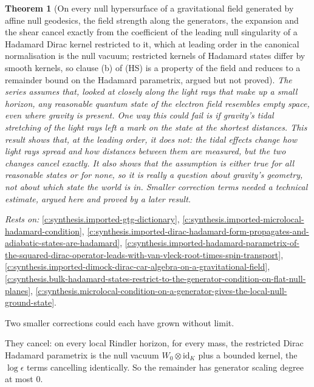 \documentclass[11pt]{article}
\newtheorem{theorem}{Theorem}[section]
\theoremstyle{definition}
\theoremstyle{plain}
\providecommand{\id}{}\renewcommand{\id}{\mathrm{id}}
\begin{document}
\begin{theorem}[On every null hypersurface of a gravitational field generated by affine null geodesics, the field strength along the generators, the expansion and the shear cancel exactly from the coefficient of the leading null singularity of a Hadamard Dirac kernel restricted to it, which at leading order in the canonical normalisation is the null vacuum; restricted kernels of Hadamard states differ by smooth kernels, so clause (b) of (HS) is a property of the field and reduces to a remainder bound on the Hadamard parametrix, argued but not proved]\label{c:synthesis.field-strength-cancels-from-the-leading-null-singularity-of-hadamard-dirac-states-on-null-hypersurfaces}
The series assumes that, looked at closely along the light rays that make up a small horizon, any reasonable quantum state of the electron field resembles empty space, even where gravity is present. One way this could fail is if gravity's tidal stretching of the light rays left a mark on the state at the shortest distances. This result shows that, at the leading order, it does not: the tidal effects change how light rays spread and how distances between them are measured, but the two changes cancel exactly. It also shows that the assumption is either true for all reasonable states or for none, so it is really a question about gravity's geometry, not about which state the world is in. Smaller correction terms needed a technical estimate, argued here and proved by a later result.
\end{theorem}
\noindent\emph{Rests on:} \ref{c:synthesis.imported-gtg-dictionary}, \ref{c:synthesis.imported-microlocal-hadamard-condition}, \ref{c:synthesis.imported-dirac-hadamard-form-propagates-and-adiabatic-states-are-hadamard}, \ref{c:synthesis.imported-hadamard-parametrix-of-the-squared-dirac-operator-leads-with-van-vleck-root-times-spin-transport}, \ref{c:synthesis.imported-dimock-dirac-car-algebra-on-a-gravitational-field}, \ref{c:synthesis.bulk-hadamard-states-restrict-to-the-generator-condition-on-flat-null-planes}, \ref{c:synthesis.microlocal-condition-on-a-generator-gives-the-local-null-ground-state}.

Two smaller corrections could each have grown without limit.

They cancel: on every local Rindler horizon, for every mass, the restricted Dirac Hadamard parametrix is the null vacuum $W_{0}\otimes\id_{K}$ plus a bounded kernel, the $\log\epsilon$ terms cancelling identically. So the remainder has generator scaling degree at most $0$.
\end{document}
